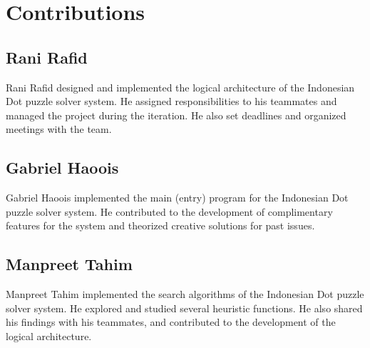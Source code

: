 \section{Contributions}

\subsection{Rani Rafid}

Rani Rafid designed and implemented the logical architecture of the Indonesian Dot puzzle solver system. He assigned responsibilities to his teammates and managed the project during the iteration. He also set deadlines and organized meetings with the team.

\subsection{Gabriel Haoois}

Gabriel Haoois implemented the main (entry) program for the Indonesian Dot puzzle solver system. He contributed to the development of complimentary features for the system and theorized creative solutions for past issues.


\subsection{Manpreet Tahim}

Manpreet Tahim implemented the search algorithms of the Indonesian Dot puzzle solver system. He explored and studied several heuristic functions. He also shared his findings with his teammates, and contributed to the development of the logical architecture.

